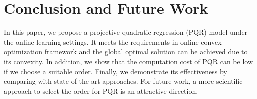 \documentclass[letterpaper]{article} %
\theoremstyle{plain}
\theoremstyle{definition}
\begin{document}
\section{Conclusion and Future Work}\label{con_sec}

In this paper, we propose a projective quadratic regression (PQR) model under the online learning settings. It meets the requirements in online convex optimization framework and the global optimal solution can be achieved due to its convexity. In addition, we show that the computation cost of PQR can be low if we choose a suitable order. Finally, we demonstrate its effectiveness by comparing with state-of-the-art approaches. For future work, a more scientific approach to select the order for PQR is an attractive direction.



\end{document}

